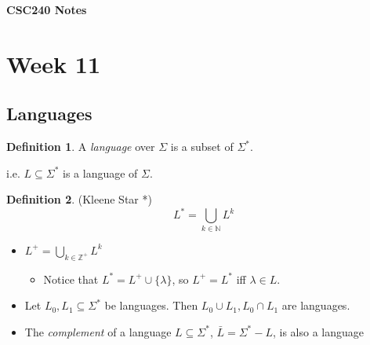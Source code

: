 \documentclass{article}
\newcommand\Ints{{\mathbb{Z}}}
\newcommand\Nats{{\mathbb{N}}}
\theoremstyle{definition}
\newtheorem*{definition*}{Definition}
\begin{document}
\begin{center}
\textbf{\Large CSC240 Notes}
\end{center}

\newpage

\section*{Week 11}
\subsection{Languages}
\begin{bigbox}
    \begin{definition*}
        A \textit{language} over $\Sigma$ is a subset of $\Sigma^*$. 
    \end{definition*} 
\end{bigbox}
\begin{writenote}
    i.e. $L\subseteq\Sigma^*$ is a language of $\Sigma$.
\end{writenote}

\begin{bigbox}
    \begin{definition*}
        (Kleene Star *)\begin{equation*}
            L^*=\bigcup_{k\in\Nats}L^k
        \end{equation*}
    \end{definition*}
\end{bigbox}
\begin{writenote}
    \begin{itemize}
        \item $L^+=\bigcup_{k\in\Ints^+}L^k$
        \begin{itemize}
            \item Notice that $L^*=L^+\cup\{\lambda\}$, so $L^+=L^*$ iff $\lambda\in L$.
        \end{itemize}
        \item Let $L_0,L_1\subseteq\Sigma^*$ be languages. Then $L_0\cup L_1,L_0\cap L_1$ are languages.
        \item The \textit{complement} of a language $L\subseteq\Sigma^*$, $\bar{L}=\Sigma^*-L$, is also a language
    \end{itemize}
\end{writenote}
\end{document}
